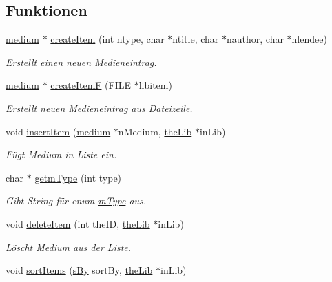 \subsection*{Funktionen}
\begin{DoxyCompactItemize}
\item 
\hyperlink{structmedium}{medium} $\ast$ \hyperlink{group___lend_lib_item_ga1185f2a8edcaade3abe78fcb9b12b296}{create\+Item} (int ntype, char $\ast$ntitle, char $\ast$nauthor, char $\ast$nlendee)
\begin{DoxyCompactList}\small\item\em Erstellt einen neuen Medieneintrag. \end{DoxyCompactList}\item 
\hyperlink{structmedium}{medium} $\ast$ \hyperlink{group___lend_lib_item_ga3c252a365f5cd607504a6844fa834fa0}{create\+ItemF} (F\+I\+LE $\ast$libitem)
\begin{DoxyCompactList}\small\item\em Erstellt neuen Medieneintrag aus Dateizeile. \end{DoxyCompactList}\item 
void \hyperlink{group___lend_lib_item_ga058529b36e24022df82cbd493da36546}{insert\+Item} (\hyperlink{structmedium}{medium} $\ast$n\+Medium, \hyperlink{structthe_lib}{the\+Lib} $\ast$in\+Lib)
\begin{DoxyCompactList}\small\item\em Fügt Medium in Liste ein. \end{DoxyCompactList}\item 
char $\ast$ \hyperlink{group___lend_lib_item_ga4035658306db5a1a5377f03fde86fc07}{getm\+Type} (int type)
\begin{DoxyCompactList}\small\item\em Gibt String für enum \hyperlink{group___lend_lib_item_ga636cfca014f3212ea82d45e28f9cb51b}{m\+Type} aus. \end{DoxyCompactList}\item 
void \hyperlink{group___lend_lib_item_ga447b6570a741216e0c956834b457babe}{delete\+Item} (int the\+ID, \hyperlink{structthe_lib}{the\+Lib} $\ast$in\+Lib)
\begin{DoxyCompactList}\small\item\em Löscht Medium aus der Liste. \end{DoxyCompactList}\item 
void \hyperlink{group___lend_lib_item_ga830122f0b78ac6606bfca2103065677c}{sort\+Items} (\hyperlink{group___lend_lib_item_ga557119015745f6890b5eb4367beba8f3}{s\+By} sort\+By, \hyperlink{structthe_lib}{the\+Lib} $\ast$in\+Lib)

\end{DoxyCompactItemize}
